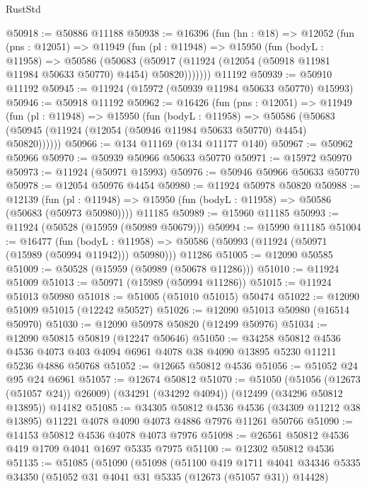 \begin{lexlean}{RustStd}
\begin{coremodule}
@50918 := @50886 @11188
@50938 := @16396
    (fun (hn : @18) =>
    @12052
      (fun (pns : @12051) =>
      @11949
        (fun (pl : @11948) =>
        @15950
          (fun (bodyL : @11958) =>
          @50586
            (@50683
              (@50917 (@11924 (@12054 (@50918 @11981 @11984 @50633 @50770) @4454) @50820)))))))
    @11192
@50939 := @50910 @11192
@50945 := @11924 (@15972 (@50939 @11984 @50633 @50770) @15993)
@50946 := @50918 @11192
@50962 := @16426
    (fun (pns : @12051) =>
    @11949
      (fun (pl : @11948) =>
      @15950
        (fun (bodyL : @11958) =>
        @50586 (@50683 (@50945 (@11924 (@12054 (@50946 @11984 @50633 @50770) @4454) @50820))))))
@50966 := @134 @11169 (@134 @11177 @140)
@50967 := @50962 @50966
@50970 := @50939 @50966 @50633 @50770
@50971 := @15972 @50970
@50973 := @11924 (@50971 @15993)
@50976 := @50946 @50966 @50633 @50770
@50978 := @12054 @50976 @4454
@50980 := @11924 @50978 @50820
@50988 := @12139
    (fun (pl : @11948) => @15950 (fun (bodyL : @11958) => @50586 (@50683 (@50973 @50980))))
    @11185
@50989 := @15960 @11185
@50993 := @11924 (@50528 (@15959 (@50989 @50679)))
@50994 := @15990 @11185
@51004 := @16477
    (fun (bodyL : @11958) => @50586 (@50993 (@11924 (@50971 (@15989 (@50994 @11942))) @50980)))
    @11286
@51005 := @12090 @50585
@51009 := @50528 (@15959 (@50989 (@50678 @11286)))
@51010 := @11924 @51009
@51013 := @50971 (@15989 (@50994 @11286))
@51015 := @11924 @51013 @50980
@51018 := @51005 (@51010 @51015) @50474
@51022 := @12090 @51009 @51015 (@12242 @50527)
@51026 := @12090 @51013 @50980 (@16514 @50970)
@51030 := @12090 @50978 @50820 (@12499 @50976)
@51034 := @12090 @50815 @50819 (@12247 @50646)
@51050 := @34258
    @50812
    @4536
    @4536
    @4073
    @403
    @4094
    @6961
    @4078
    @38
    @4090
    @13895
    @5230
    @11211
    @5236
    @4886
    @50768
@51052 := @12665 @50812 @4536
@51056 := @51052 @24 @95 @24 @6961
@51057 := @12674 @50812
@51070 := @51050
    (@51056 (@12673 (@51057 @24)) @26009)
    (@34291 (@34292 @4094))
    (@12499 (@34296 @50812 @13895))
    @14182
@51085 := @34305
    @50812
    @4536
    @4536
    (@34309 @11212 @38 @13895)
    @11221
    @4078
    @4090
    @4073
    @4886
    @7976
    @11261
    @50766
@51090 := @14153 @50812 @4536 @4078 @4073 @7976
@51098 := @26561 @50812 @4536 @419 @1709 @4041 @1697 @5335 @7975
@51100 := @12302 @50812 @4536
@51135 := @51085
    (@51090
      (@51098
        (@51100
          @419
          @1711
          @4041
          @34346
          @5335
          @34350
          (@51052 @31 @4041 @31 @5335 (@12673 (@51057 @31)) @14428)

\end{coremodule}
\end{lexlean}
